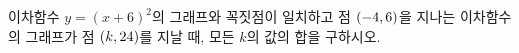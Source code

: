 이차함수 $y=(x+6)^2$의 그래프와 꼭짓점이 일치하고 점 $(-4{,}\mkern3mu 6)$을 지나는 이차함수의 그래프가 점 $(k{,}\mkern3mu 24)$를 지날 때, 모든 $k$의 값의 합을 구하시오.
